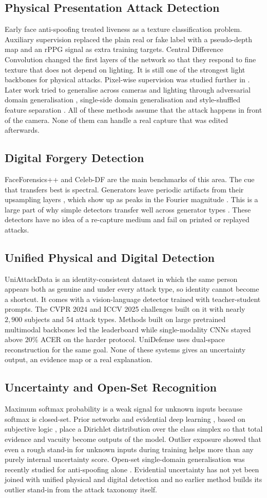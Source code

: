 \documentclass[conference]{IEEEtran}
\newcommand{\sub}[1]{\subsection{\texorpdfstring{\textbf{#1}}{#1}}}
\begin{document}
\sub{Physical Presentation Attack Detection}
Early face anti-spoofing treated liveness as a texture classification problem.
Auxiliary supervision \cite{liu2018auxiliary} replaced the plain real or fake label
with a pseudo-depth map and an rPPG signal as extra training targets. Central
Difference Convolution \cite{yu2020cdcn} changed the first layers of the network so
that they respond to fine texture that does not depend on lighting. It is still one of
the strongest light backbones for physical attacks. Pixel-wise supervision was studied
further in \cite{yu2021revisiting}. Later work tried to generalise across cameras and
lighting through adversarial domain generalisation \cite{shao2019mada}, single-side
domain generalisation \cite{jia2020ssdg} and style-shuffled feature separation
\cite{wang2022ssan}. All of these methods assume that the attack happens in front of
the camera. None of them can handle a real capture that was edited afterwards.

\sub{Digital Forgery Detection}
FaceForensics++ \cite{rossler2019ff} and Celeb-DF \cite{li2020celebdf} are the main
benchmarks of this area. The cue that transfers best is spectral. Generators leave
periodic artifacts from their upsampling layers \cite{odena2016checkerboard}, which
show up as peaks in the Fourier magnitude \cite{frank2020frequency}. This is a large
part of why simple detectors transfer well across generator types
\cite{wang2020cnnspot}. These detectors have no idea of a re-capture medium and fail
on printed or replayed attacks.

\sub{Unified Physical and Digital Detection}
UniAttackData \cite{yu2024unified} is an identity-consistent dataset in which the same
person appears both as genuine and under every attack type, so identity cannot become
a shortcut. It comes with a vision-language detector trained with teacher-student
prompts. The CVPR 2024 and ICCV 2025 challenges built on it
\cite{yuan2024challenge,ma2025uniattackplus} with nearly $2{,}900$ subjects and $54$
attack types. Methods built on large pretrained multimodal backbones led the
leaderboard while single-modality CNNs stayed above $20\%$ ACER on the harder
protocol. UniDefense \cite{zhang2024unidefense} uses dual-space reconstruction for the
same goal. None of these systems gives an uncertainty output, an evidence map or a
real explanation.

\sub{Uncertainty and Open-Set Recognition}
Maximum softmax probability \cite{hendrycks2017msp} is a weak signal for unknown inputs
because softmax is closed-set. Prior networks \cite{malinin2018prior} and evidential
deep learning \cite{sensoy2018edl}, based on subjective logic
\cite{josang2016subjective}, place a Dirichlet distribution over the class simplex so
that total evidence and vacuity become outputs of the model. Outlier exposure
\cite{hendrycks2019oe} showed that even a rough stand-in for unknown inputs during
training helps more than any purely internal uncertainty score. Open-set
single-domain generalisation was recently studied for anti-spoofing alone
\cite{liu2024openset}. Evidential uncertainty has not yet been joined with unified
physical and digital detection and no earlier method builds its outlier stand-in from
the attack taxonomy itself.
\end{document}
